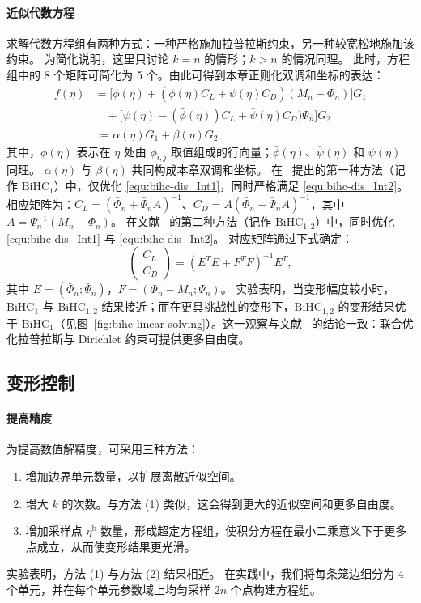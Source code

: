 \paragraph{近似代数方程}
求解代数方程组有两种方式：一种严格施加拉普拉斯约束，另一种较宽松地施加该约束。
为简化说明，这里只讨论 \(k=n\) 的情形；\(k>n\) 的情况同理。
此时，方程组中的 8 个矩阵可简化为 5 个。由此可得到本章正则化双调和坐标的表达：
\begin{equation}\label{equ:bihc-final_BHC}
    \begin{aligned}
f(\eta) &= \big[ \phi(\eta) + (\bar{\phi}(\eta) C_L + \bar{\psi}(\eta) C_D)(M_n - \Phi_n) \big] G_1 \\
&\quad + \big[ \psi(\eta) - (\bar{\phi}(\eta)) C_L + \bar{\psi}(\eta) C_D)\Psi_n \big] G_2  \\
&:=\alpha(\eta)G_1+\beta(\eta)G_2
\end{aligned}
\end{equation}
其中，\(\phi(\eta)\) 表示在 \(\eta\) 处由 \(\phi_{i,j}\) 取值组成的行向量；\(\bar{\phi}(\eta)\)、\(\bar{\psi}(\eta)\) 和 \(\psi(\eta)\) 同理。
\(\alpha(\eta)\) 与 \(\beta(\eta)\) 共同构成本章双调和坐标。
在~\cite{Weber2012} 提出的第一种方法（记作 $\text{BiHC}_1$）中，仅优化 \eqref{equ:bihc-dis_Int1}，同时严格满足 \eqref{equ:bihc-dis_Int2}。
相应矩阵为：\(C_L = (\bar{\Phi}_n + \bar{\Psi}_n A)^{-1}\)、\(C_D = A (\bar{\Phi}_n + \bar{\Psi}_n A)^{-1}\)，其中 \(A = \Psi_n^{-1} (M_n - \Phi_n)\)。
%
在文献~\cite{thiery2024biharmonic} 的第二种方法（记作 $\text{BiHC}_{1,2}$）中，同时优化 \eqref{equ:bihc-dis_Int1} 与 \eqref{equ:bihc-dis_Int2}。
对应矩阵通过下式确定：
\[
\begin{pmatrix}
C_L \\
C_D
\end{pmatrix} = \left( E^T E + F^T F \right)^{-1} E^T,
\]
其中 \(E = (\bar{\Phi}_n; \bar{\Psi}_n)\)，\(F = (\Phi_n - M_n; \Psi_n)\)。
实验表明，当变形幅度较小时，$\text{BiHC}_{1}$ 与 $\text{BiHC}_{1,2}$ 结果接近；而在更具挑战性的变形下，$\text{BiHC}_{1,2}$ 的变形结果优于 $\text{BiHC}_{1}$（见图~\ref{fig:bihc-linear-solving}）。这一观察与文献~\cite{thiery2024biharmonic} 的结论一致：联合优化拉普拉斯与 Dirichlet 约束可提供更多自由度。


\subsection{变形控制}\label{sec:bihc-deformation}

\paragraph{提高精度}
为提高数值解精度，可采用三种方法：
\begin{enumerate}
    \item 增加边界单元数量，以扩展离散近似空间。
    \item 增大 \(k\) 的次数。与方法 (1) 类似，这会得到更大的近似空间和更多自由度。
    \item 增加采样点 \(\eta^\text{b}\) 数量，形成超定方程组，使积分方程在最小二乘意义下于更多点成立，从而使变形结果更光滑。
\end{enumerate}
实验表明，方法 (1) 与方法 (2) 结果相近。
在实践中，我们将每条笼边细分为 4 个单元，并在每个单元参数域上均匀采样 \(2n\) 个点构建方程组。

